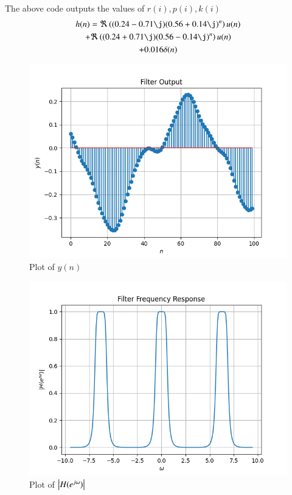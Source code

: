 \documentclass[journal,12pt,twocolumn]{IEEEtran}
\renewcommand\thesection{\arabic{section}}
\begin{document}
\begin{enumerate}[label=\thesection.\arabic*]
       The above code outputs the values of $r(i), p(i), k(i)$
       \begin{multline}
         h(n) = 
         \Re\brak{(0.24 - 0.71\j)(0.56 + 0.14\j)^n} u(n) \\
         + \Re\brak{(0.24 + 0.71\j)(0.56 - 0.14\j)^n} u(n) \\
         + 0.016\delta(n)
       \end{multline}
       
       \begin{figure}[!ht]
         \centering
         \includegraphics[width=\columnwidth]{./figs/8.2.1.png}
         \caption{Plot of $y(n)$}
         \label{fig-8.2.1}	
       \end{figure}
       
       \begin{figure}[!ht]
         \centering
         \includegraphics[width=\columnwidth]{./figs/8.2.2.png}
         \caption{Plot of $\left\vert H(e^{j\omega})\right\vert$}
         \label{fig-8.2.2}	
       \end{figure}
       

\end{enumerate}
\end{document}
